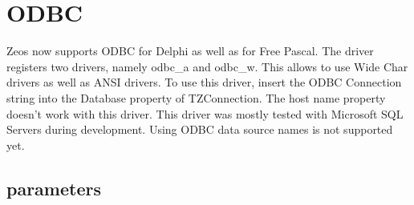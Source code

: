 \documentclass[a4paper,12pt,oneside]{article}
\begin{document}
\section{ODBC}
Zeos now supports ODBC for Delphi as well as for Free Pascal.
The driver registers two drivers, namely odbc\_a and odbc\_w.
This allows to use Wide Char drivers as well as ANSI drivers.
To use this driver, insert the ODBC Connection string into the Database property of TZConnection.
The host name property doesn't work with this driver.
This driver was mostly tested with Microsoft SQL Servers during development.
Using ODBC data source names is not supported yet.

\subsection{parameters}
\end{document}

